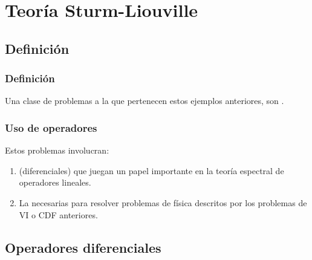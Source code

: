 \documentclass[12pt]{beamer}
\begin{document}
\section{Teoría Sturm-Liouville}
\subsection{Definición}

\begin{frame}
\frametitle{Definición}
Una clase de problemas a la que pertenecen estos ejemplos anteriores, son .
\end{frame}
\begin{frame}
\frametitle{Uso de operadores}
Estos problemas involucran:
\begin{enumerate}[<+->]
\item {} (diferenciales) que juegan un papel importante en la teoría espectral de operadores lineales.
\item La  necesarias para resolver problemas de física descritos por los problemas de VI o CDF anteriores.
\end{enumerate}
\end{frame}

\subsection{Operadores diferenciales}
\end{document}
